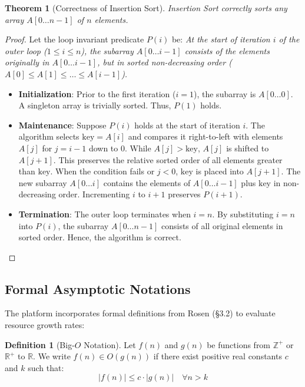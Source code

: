 \documentclass[11pt,a4paper]{article}
\theoremstyle{definition}
\newtheorem{definition}{Definition}[section]
\theoremstyle{plain}
\newtheorem{theorem}{Theorem}[section]
\theoremstyle{remark}
\begin{document}
\begin{theorem}[Correctness of Insertion Sort]
Insertion Sort correctly sorts any array $A[0 \dots n-1]$ of $n$ elements.
\end{theorem}

\begin{proof}
Let the loop invariant predicate $P(i)$ be: \textit{At the start of iteration $i$ of the outer loop ($1 \le i \le n$), the subarray $A[0 \dots i-1]$ consists of the elements originally in $A[0 \dots i-1]$, but in sorted non-decreasing order ($A[0] \le A[1] \le \dots \le A[i-1]$).}

\begin{itemize}
    \item \textbf{Initialization}: Prior to the first iteration ($i = 1$), the subarray is $A[0 \dots 0]$. A singleton array is trivially sorted. Thus, $P(1)$ holds.
    \item \textbf{Maintenance}: Suppose $P(i)$ holds at the start of iteration $i$. The algorithm selects $\text{key} = A[i]$ and compares it right-to-left with elements $A[j]$ for $j = i-1$ down to $0$. While $A[j] > \text{key}$, $A[j]$ is shifted to $A[j+1]$. This preserves the relative sorted order of all elements greater than $\text{key}$. When the condition fails or $j < 0$, $\text{key}$ is placed into $A[j+1]$. The new subarray $A[0 \dots i]$ contains the elements of $A[0 \dots i-1]$ plus $\text{key}$ in non-decreasing order. Incrementing $i$ to $i+1$ preserves $P(i+1)$.
    \item \textbf{Termination}: The outer loop terminates when $i = n$. By substituting $i = n$ into $P(i)$, the subarray $A[0 \dots n-1]$ consists of all original elements in sorted order. Hence, the algorithm is correct.
\end{itemize}
\end{proof}

\subsection{Formal Asymptotic Notations}
The platform incorporates formal definitions from Rosen (\S3.2) to evaluate resource growth rates:

\begin{definition}[Big-$O$ Notation]
Let $f(n)$ and $g(n)$ be functions from $\mathbb{Z}^+$ or $\mathbb{R}^+$ to $\mathbb{R}$. We write $f(n) \in O(g(n))$ if there exist positive real constants $c$ and $k$ such that:
\begin{equation}
|f(n)| \le c \cdot |g(n)| \quad \forall n > k
\end{equation}
\end{definition}
\end{document}
